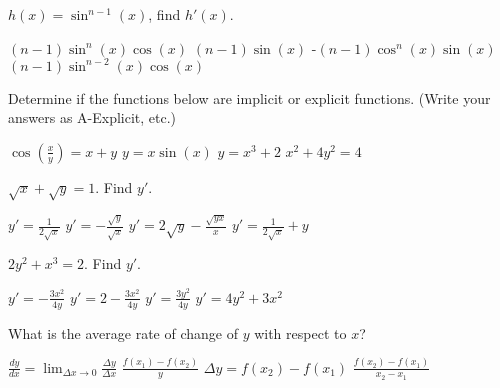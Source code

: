 \documentclass[addpoints, 12pt]{exam}%
\newcommand{\spc}{\vspace*{0.5cm}}
\begin{document}
\begin{questions}
\spc

\question[1]

$h(x) = \sin^{n-1}(x)$, find $h'(x)$.

\begin{multicols}{2}
\begin{choices}
\choice $(n-1)\sin^n(x)\cos(x)$
\choice $(n-1)\sin(x)$
\choice -$(n-1)\cos^n(x)\sin(x)$
\CorrectChoice $(n-1)\sin^{n-2}(x) \cos(x)$
\end{choices}
\end{multicols}


\question[1]

Determine if the functions below are implicit or explicit functions. 
(Write your answers as A-Explicit, etc.)

\begin{multicols}{2}
\begin{choices}
\choice $\cos(\frac{x}{y}) = x+y$
\choice $y = x \sin(x)$
\choice $y = x^3 + 2$
\choice $x^2 + 4y^2 = 4$
\end{choices}
\end{multicols}

\spc

\question[1]

$\sqrt{x} + \sqrt{y} = 1$. Find $y'$.

\begin{multicols}{2}
\begin{choices}
\choice $y' = \displaystyle\frac{1}{2\sqrt{x}}$
\CorrectChoice $y' = \displaystyle -\frac{\sqrt{y}}{\sqrt{x}}$
\choice $y' = \displaystyle 2\sqrt{y} - \frac{\sqrt{yx}}{x}$
\choice $y' = \displaystyle\frac{1}{2\sqrt{x}} 
+ y$
\end{choices}
\end{multicols}

\spc

\question[1]

$2y^2 + x^3 = 2$. Find $y'$.

\begin{multicols}{2}
\begin{choices}
\CorrectChoice $y' = \displaystyle-\frac{3x^2}{4y}$
\choice $y' = \displaystyle2 - \frac{3x^2}{4y}$
\choice $y' = \displaystyle\frac{3y^2}{4y}$
\choice $y' = 4y^2 + 3x^2$
\end{choices}
\end{multicols}

\spc

\question[1]

What is the average rate of change of $y$ with respect to $x$?
\begin{multicols}{2}
\begin{choices}
\choice $\displaystyle\frac{dy}{dx} = \lim_{\Delta x \to 0} \frac{\Delta y}{\Delta x}$
\choice $\displaystyle\frac{f(x_1) - f(x_2)}{y}$
\choice $\Delta y = f(x_2) - f(x_1)$
\CorrectChoice $\displaystyle\frac{f(x_2) - f(x_1)}{x_2 - x_1}$
\end{choices}
\end{multicols}


\end{questions}
\end{document}
